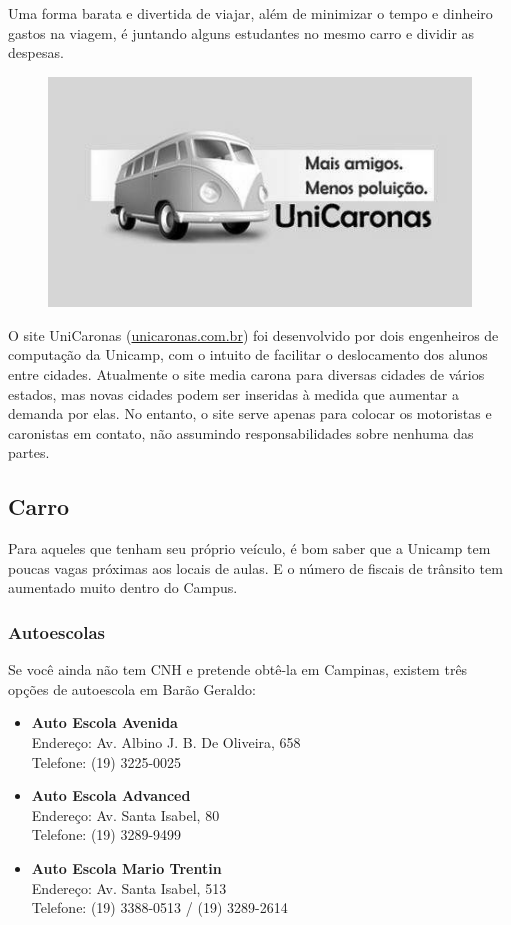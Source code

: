 Uma forma barata e divertida de viajar, além de minimizar o tempo e dinheiro
gastos na viagem, é juntando alguns estudantes no mesmo carro e dividir as
despesas.
\begin{figure}[h!]
    \centering
    \includegraphics[scale=0.55,keepaspectratio=true]{img/imgs/8-transporte/unicaronas.jpg}
\end{figure}


O site UniCaronas (\url{unicaronas.com.br}) foi desenvolvido por dois
engenheiros de computação da Unicamp, com o intuito de facilitar o deslocamento
dos alunos entre cidades. Atualmente o site media carona para diversas cidades
de vários estados, mas novas cidades podem ser inseridas à medida que aumentar a
demanda por elas. No entanto, o site serve apenas para colocar os motoristas e
caronistas em contato, não assumindo responsabilidades sobre nenhuma das partes.

\subsection{Carro}

Para aqueles que tenham seu próprio veículo, é bom saber que a Unicamp tem
poucas vagas próximas aos locais de aulas. E o número de fiscais de trânsito tem
aumentado muito dentro do Campus.

\subsubsection*{Autoescolas}

Se você ainda não tem CNH e pretende obtê-la em Campinas, existem três opções de
autoescola em Barão Geraldo:

\begin{itemize}
    \item  \textbf{Auto Escola Avenida}
        \\Endereço: Av. Albino J. B. De Oliveira, 658
        \\Telefone: (19) 3225-0025

    \item  \textbf{Auto Escola Advanced}
        \\Endereço: Av. Santa Isabel, 80
        \\Telefone: (19) 3289-9499

    \item  \textbf{Auto Escola Mario Trentin}
        \\Endereço: Av. Santa Isabel, 513
        \\Telefone: (19) 3388-0513 / (19) 3289-2614
\end{itemize}

